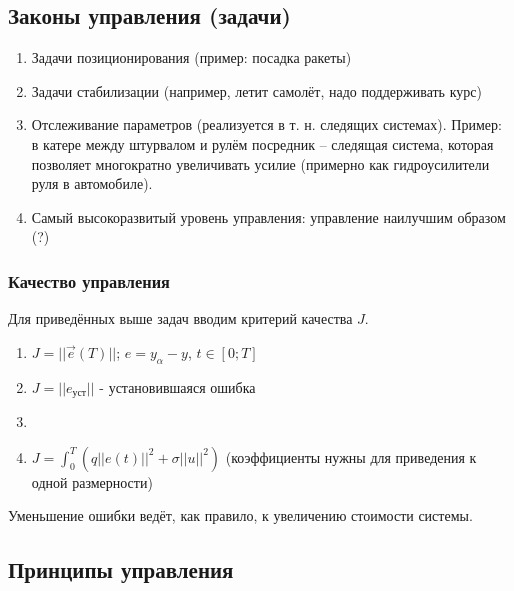\documentclass[main.tex]{subfiles}
\begin{document}
\subsection{Законы управления (задачи)}

\begin{enumerate}
	\item Задачи позиционирования (пример: посадка ракеты)
	\item Задачи стабилизации (например, летит самолёт, надо поддерживать курс)
	\item Отслеживание параметров (реализуется в т. н. следящих системах).
	Пример: в катере между штурвалом и рулём посредник -- следящая система, которая позволяет многократно увеличивать усилие (примерно как гидроусилители руля в автомобиле).
	\item Самый высокоразвитый уровень управления: управление наилучшим образом (?)
\end{enumerate}

\subsubsection{Качество управления}

Для приведённых выше задач вводим критерий качества $ J $.

\begin{enumerate}[noitemsep]
	\item $J= ||\vec e(T)|| $; $ e = y_\alpha - y $, $ t \in [0;T] $
	\item $ J =||e_{\text{уст}}|| $ - установившаяся ошибка
	\item 
	\item $ J = \int_{0}^{T}(q ||e(t)||^2 +  \sigma||u||^2)$ (коэффициенты нужны для приведения к одной размерности)
\end{enumerate}

Уменьшение ошибки ведёт, как правило, к увеличению стоимости системы.

\subsection{Принципы управления}
\end{document}
